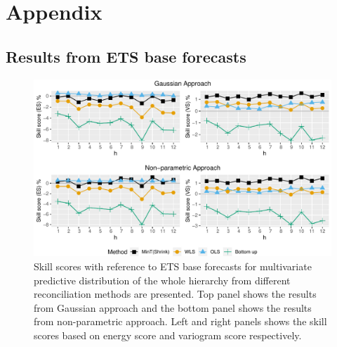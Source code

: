 \documentclass[12pt]{article}
\theoremstyle{definition}
\begin{document}
\newpage
\section{Appendix}

\subsection{Results from ETS base forecasts}

\begin{figure}[!hbt]
	\centering
	\small
	\includegraphics[width= .95\textwidth]{Empirical-results/AllTS_MultiVScores_ETS.pdf}
	\caption{Skill scores with reference to ETS base forecasts for multivariate predictive distribution of the whole hierarchy from different reconciliation methods are presented. Top panel shows the results from Gaussian approach and the bottom panel shows the results from non-parametric approach. Left and right panels shows the skill scores based on energy score and variogram score respectively.}\label{fig:EmpResults_AllTS_ETS}
\end{figure}
\end{document}
